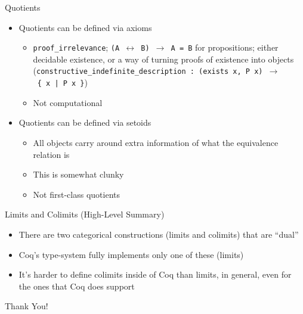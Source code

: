 \documentclass[utf8x]{beamer}
\begin{document}
    \begin{frame}{Quotients}
      \begin{itemize}
        \item Quotients can be defined via axioms \pause
        \begin{itemize}
          \item
            \texttt{proof\_irrelevance}; \texttt{(A $\leftrightarrow$ B) $\to$ A = B} for propositions; either decidable existence, or a way of turning proofs of existence into objects (\texttt{constructive\_indefinite\_description : (exists~x,~P~x)~$\to$~\{~x~|~P~x~\}})
          \item
            Not computational
        \end{itemize} \pause
        \item Quotients can be defined via setoids \pause
        \begin{itemize}
          \item
            All objects carry around extra information of what the equivalence relation is
          \item
            This is somewhat clunky
          \item
            Not first-class quotients
        \end{itemize}
      \end{itemize}
    \end{frame}
    
    \begin{frame}{Limits and Colimits (High-Level Summary)}
      \begin{itemize}
        \item
          There are two categorical constructions (limits and colimits) that are ``dual'' \pause
        \item
          Coq's type-system fully implements only one of these (limits) \pause
        \item
          It's harder to define colimits inside of Coq than limits, in general, even for the ones that Coq does support
      \end{itemize}
    \end{frame}

  \begin{frame}
    \fontsize{128}{0}\selectfont\begin{center}Thank You!\end{center}
  \end{frame}
\end{document}
